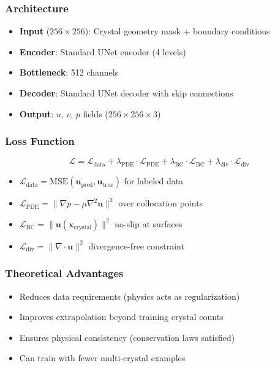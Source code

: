 \subsubsection{Architecture}
\begin{itemize}
    \item \textbf{Input} ($256 \times 256$): Crystal geometry mask + boundary conditions
    \item \textbf{Encoder}: Standard UNet encoder (4 levels)
    \item \textbf{Bottleneck}: 512 channels
    \item \textbf{Decoder}: Standard UNet decoder with skip connections
    \item \textbf{Output}: $u$, $v$, $p$ fields ($256 \times 256 \times 3$)
\end{itemize}

\subsubsection{Loss Function}
\begin{equation}
\mathcal{L} = \mathcal{L}_{\text{data}} + \lambda_{\text{PDE}} \cdot \mathcal{L}_{\text{PDE}} + \lambda_{\text{BC}} \cdot \mathcal{L}_{\text{BC}} + \lambda_{\text{div}} \cdot \mathcal{L}_{\text{div}}
\end{equation}
\begin{itemize}
    \item $\mathcal{L}_{\text{data}} = \text{MSE}(\mathbf{u}_{\text{pred}}, \mathbf{u}_{\text{true}})$ for labeled data
    \item $\mathcal{L}_{\text{PDE}} = \|\nabla p - \mu \nabla^2 \mathbf{u}\|^2$ over collocation points
    \item $\mathcal{L}_{\text{BC}} = \|\mathbf{u}(\mathbf{x}_{\text{crystal}})\|^2$ no-slip at surfaces
    \item $\mathcal{L}_{\text{div}} = \|\nabla \cdot \mathbf{u}\|^2$ divergence-free constraint
\end{itemize}

\subsubsection{Theoretical Advantages}
\begin{itemize}
    \item Reduces data requirements (physics acts as regularization)
    \item Improves extrapolation beyond training crystal counts
    \item Ensures physical consistency (conservation laws satisfied)
    \item Can train with fewer multi-crystal examples
\end{itemize}

